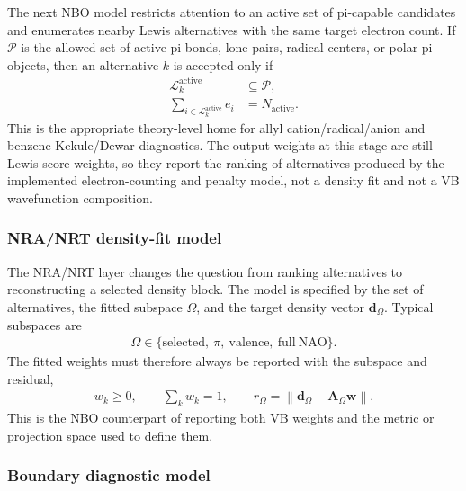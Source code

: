 \documentclass[11pt]{article}
\begin{document}
The next NBO model restricts attention to an active set of pi-capable candidates and enumerates nearby Lewis alternatives with the same target electron count.  If $\mathcal{P}$ is the allowed set of active pi bonds, lone pairs, radical centers, or polar pi objects, then an alternative $k$ is accepted only if
\begin{equation}
\begin{aligned}
	\mathcal{L}_k^{\mathrm{active}} &\subseteq \mathcal{P}, \\
	\sum_{i\in \mathcal{L}_k^{\mathrm{active}}} e_i &= N_{\mathrm{active}}.
\end{aligned}
\end{equation}
This is the appropriate theory-level home for allyl cation/radical/anion and benzene Kekule/Dewar diagnostics.  The output weights at this stage are still Lewis score weights, so they report the ranking of alternatives produced by the implemented electron-counting and penalty model, not a density fit and not a VB wavefunction composition.

\subsubsection*{NRA/NRT density-fit model}

The NRA/NRT layer changes the question from ranking alternatives to reconstructing a selected density block.  The model is specified by the set of alternatives, the fitted subspace $\Omega$, and the target density vector $\mathbf{d}_{\Omega}$.  Typical subspaces are
\begin{equation}
\begin{aligned}
	\Omega \in
	\{\mathrm{selected},\ \pi,\ \mathrm{valence},\ \mathrm{full\ NAO}\}.
\end{aligned}
\end{equation}
The fitted weights must therefore always be reported with the subspace and residual,
\begin{equation}
\begin{aligned}
	w_k \ge 0,
	\qquad
	\sum_k w_k = 1,
	\qquad
	r_{\Omega}=\left\|\mathbf{d}_{\Omega}-\mathbf{A}_{\Omega}\mathbf{w}\right\|.
\end{aligned}
\end{equation}
This is the NBO counterpart of reporting both VB weights and the metric or projection space used to define them.

\subsubsection*{Boundary diagnostic model}
\end{document}
